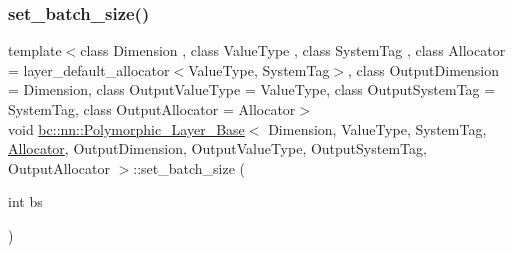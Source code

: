 \mbox{\label{structbc_1_1nn_1_1Polymorphic__Layer__Base_a4d11290c40096f27144a6ec9fa976b12}} 
\subsubsection{\texorpdfstring{set\+\_\+batch\+\_\+size()}{set\_batch\_size()}\hspace{0.1cm}{\footnotesize\ttfamily [2/2]}}
{\footnotesize\ttfamily template$<$class Dimension , class Value\+Type , class System\+Tag , class Allocator  = layer\+\_\+default\+\_\+allocator$<$\+Value\+Type, System\+Tag$>$, class Output\+Dimension  = Dimension, class Output\+Value\+Type  = Value\+Type, class Output\+System\+Tag  = System\+Tag, class Output\+Allocator  = Allocator$>$ \\
void \hyperlink{structbc_1_1nn_1_1Polymorphic__Layer__Base}{bc\+::nn\+::\+Polymorphic\+\_\+\+Layer\+\_\+\+Base}$<$ Dimension, Value\+Type, System\+Tag, \hyperlink{classbc_1_1allocators_1_1Allocator}{Allocator}, Output\+Dimension, Output\+Value\+Type, Output\+System\+Tag, Output\+Allocator $>$\+::set\+\_\+batch\+\_\+size (\begin{DoxyParamCaption}\item[{int}]{bs }\end{DoxyParamCaption})\hspace{0.3cm}{\ttfamily [inline]}}

\mbox{\label{structbc_1_1nn_1_1Polymorphic__Layer__Base_a21d145beb5e9f571e5e474171d47dff6}} 
